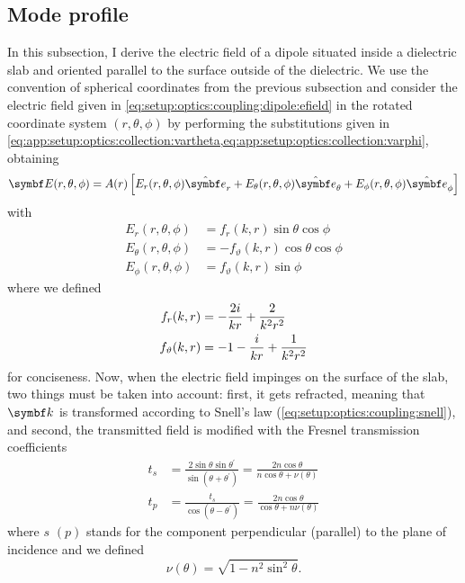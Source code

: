 \subsection{Mode profile}\label{subsec:app:setup:optics:modes}
In this subsection, I derive the electric field of a dipole situated inside a dielectric slab and oriented parallel to the surface outside of the dielectric.
We use the convention of spherical coordinates from the previous subsection and consider the electric field given in \cref{eq:setup:optics:coupling:dipole:efield} in the rotated coordinate system $(r, \theta, \phi)$ by performing the substitutions given in \cref{eq:app:setup:optics:collection:vartheta,eq:app:setup:optics:collection:varphi}, obtaining
\begin{equation}
    \bvec{E}(r, \theta, \phi) = A(r)\left[E_r(r, \theta, \phi)\ubvec{r} + E_{\theta}(r, \theta, \phi)\ubvec{\theta} + E_{\phi}(r, \theta, \phi)\ubvec{\phi}\right]
\end{equation}
with
\begin{align}
    E_r(r, \theta, \phi) &= f_r(k, r)\sin\theta\cos\phi \\
    E_{\theta}(r, \theta, \phi) &= -f_{\vartheta}(k, r)\cos\theta\cos\phi \\
    E_{\phi}(r, \theta, \phi) &= f_{\vartheta}(k, r)\sin\phi
\end{align}
where we defined
\begin{align}
    f_r(k, r) &= -\frac{2i}{k r} + \frac{2}{k^2 r^2} \\
    f_{\vartheta}(k, r) &= -1 - \frac{i}{k r} + \frac{1}{k^2 r^2}
\end{align}
for conciseness.
Now, when the electric field impinges on the surface of the slab, two things must be taken into account: first, it gets refracted, meaning that $\bvec{k}$ is transformed according to Snell's law (\cref{eq:setup:optics:coupling:snell}), and second, the transmitted field is modified with the Fresnel transmission coefficients~\cite{Hecht2017}
\begin{align}
    t_s &= \frac{2\sin\theta\sin\theta^\prime}{\sin(\theta + \theta^\prime)} = \frac{2n\cos\theta}{n\cos\theta + \nu(\theta)} \\
    t_p &= \frac{t_s}{\cos(\theta - \theta^\prime)} = \frac{2n\cos\theta}{\cos\theta + n\nu(\theta)}
\end{align}
where $s$ $(p)$ stands for the component perpendicular (parallel) to the plane of incidence and we defined
\begin{equation}
    \nu(\theta) = \sqrt{1 - n^2\sin^2\theta}.
\end{equation}
